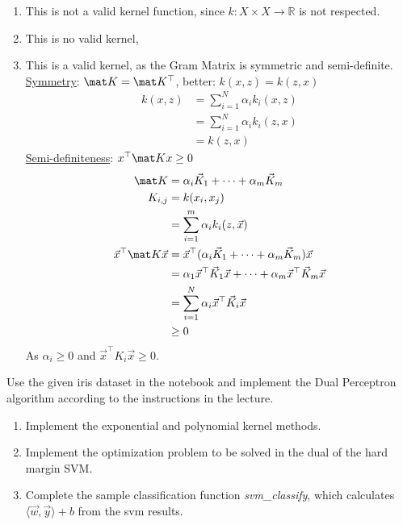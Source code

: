 \begin{solution}[print=false]
\begin{enumerate}[label=\emph{\alph*)}]
	\item This is not a valid kernel function, since $k: X\times X \to \mathbb R$ is not respected.
	\item This is no valid kernel,
	\item This is a valid kernel, as the Gram Matrix is symmetric and semi-definite.\\
	\underline{Symmetry}: $\mat K = \mat K^\top$, better:	$k(x,z) =  k(z,x)$
	\begin{align}
	k(x,z) &= \sum_{i=1}^N \alpha_i k_i(x, z)\\
	&= \sum_{i=1}^N \alpha_i k_i(z, x)\\
	&= k(z,x)
	\end{align}	
	\underline{Semi-definiteness}: $x^\top \mat K x \geq 0$
	\begin{align*}
	\mat K &= \alpha_i \vec K_1 + \dots + \alpha_m \vec K_m\\
	K_{i,j} &= k(x_i, x_j)\\
	&= \sum_{i=1}^{m} \alpha_i k_i(z,\vec x)\\
	\vec x^\top \mat K \vec x &= \vec x^\top (\alpha_i \vec K_1 + \dots + \alpha_m \vec K_m)\vec x\\
	&= \alpha_1 \vec x^\top \vec K_1 \vec x + \dots + \alpha_m \vec x^\top \vec K_m \vec x\\
	&= \sum_{i=1}^{N} \alpha_i \vec x^\top \vec K_i \vec x\\
	&\geq 0\\
	\end{align*}
	As $\alpha_i \geq 0$ and $\vec x^\top K_i \vec x \geq 0$.
\end{enumerate}
\end{solution}


\begin{exercise}[subtitle={Notebook}]
	Use the given iris dataset in the notebook and implement the Dual Perceptron algorithm according to the instructions in the lecture.
\end{exercise}


\begin{exercise}[subtitle={Notebook}]
\begin{enumerate}[label=\emph{\alph*)}]
  \item Implement the exponential and polynomial kernel methods.
  \item Implement the optimization problem to be solved in the dual of the hard margin SVM.
  \item Complete the sample classification function \textit{svm\_classify}, which calculates $\langle \vec w, \vec y \rangle + b$ from the svm results.
  \end{enumerate}
   
\end{exercise}




